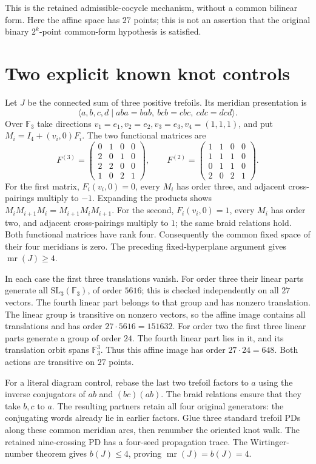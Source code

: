 \documentclass[11pt]{article}
\newcommand{\mr}{\operatorname{mr}}
\newcommand{\F}{\mathbb F}
\begin{document}
This is the retained admissible-cocycle mechanism, without
a common bilinear form. Here the affine space has $27$ points;
this is not an assertion that the original binary
$2^k$-point common-form hypothesis is satisfied.

\section{Two explicit known knot controls}

Let $J$ be the connected sum of three positive trefoils. Its
meridian presentation is
\[
 \langle a,b,c,d\mid aba=bab,\ bcb=cbc,\ cdc=dcd\rangle.
\]
Over $\F_3$ take directions
$v_1=e_1,v_2=e_2,v_3=e_3,v_4=(1,1,1)$, and put
$M_i=I_4+(v_i,0)F_i$. The two functional matrices are
\[
 F^{(3)}=\begin{pmatrix}
 0&1&0&0\\2&0&1&0\\2&2&0&0\\1&0&2&1
 \end{pmatrix},\qquad
 F^{(2)}=\begin{pmatrix}
 1&1&0&0\\1&1&1&0\\0&1&1&0\\2&0&2&1
 \end{pmatrix}.
\]
For the first matrix, $F_i(v_i,0)=0$, every $M_i$ has order
three, and adjacent cross-pairings multiply to $-1$.
Expanding the products shows $M_iM_{i+1}M_i=M_{i+1}M_iM_{i+1}$.
For the second, $F_i(v_i,0)=1$, every $M_i$ has order two,
and adjacent cross-pairings multiply to $1$; the same braid
relations hold. Both functional matrices have rank four.
Consequently the common fixed space of their four meridians
is zero. The preceding fixed-hyperplane argument gives
$\mr(J)\ge4$.

In each case the first three translations vanish. For order
three their linear parts generate all $\mathrm{SL}_3(\F_3)$,
of order $5616$; this is checked independently on all $27$
vectors. The fourth linear part belongs to that group and
has nonzero translation. The linear group is transitive on
nonzero vectors, so the affine image contains all translations
and has order $27\cdot5616=151632$. For order two the first
three linear parts generate a group of order $24$. The fourth
linear part lies in it, and its translation orbit spans
$\F_3^3$. Thus this affine image has order $27\cdot24=648$.
Both actions are transitive on $27$ points.

For a literal diagram control, rebase the last two trefoil
factors to $a$ using the inverse conjugators of $ab$ and
$(bc)(ab)$. The braid relations ensure that they take $b,c$
to $a$. The resulting partners retain all four original
generators: the conjugating words already lie in earlier
factors. Glue three standard trefoil PDs along these common
meridian arcs, then renumber the oriented knot walk. The
retained nine-crossing PD has a four-seed propagation trace.
The Wirtinger-number theorem \cite[Theorem 1.3]{wirt} gives
$b(J)\le4$, proving $\mr(J)=b(J)=4$.
\end{document}
